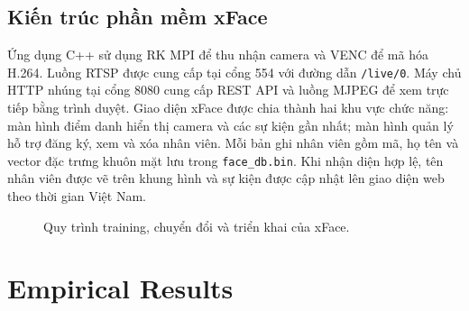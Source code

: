 \documentclass[11pt,a4paper]{article}
\begin{document}
\subsection{Kiến trúc phần mềm xFace}

Ứng dụng C++ sử dụng RK MPI để thu nhận camera và VENC để mã hóa H.264. Luồng RTSP được cung cấp tại cổng 554 với đường dẫn \texttt{/live/0}. Máy chủ HTTP nhúng tại cổng 8080 cung cấp REST API và luồng MJPEG để xem trực tiếp bằng trình duyệt. Giao diện xFace được chia thành hai khu vực chức năng: màn hình điểm danh hiển thị camera và các sự kiện gần nhất; màn hình quản lý hỗ trợ đăng ký, xem và xóa nhân viên. Mỗi bản ghi nhân viên gồm mã, họ tên và vector đặc trưng khuôn mặt lưu trong \texttt{face\_db.bin}. Khi nhận diện hợp lệ, tên nhân viên được vẽ trên khung hình và sự kiện được cập nhật lên giao diện web theo thời gian Việt Nam.

\begin{figure}[H]
\centering
{}
\caption{Quy trình training, chuyển đổi và triển khai của xFace.}
\label{fig:processing-flow}
\end{figure}

\section{Empirical Results}
\end{document}
